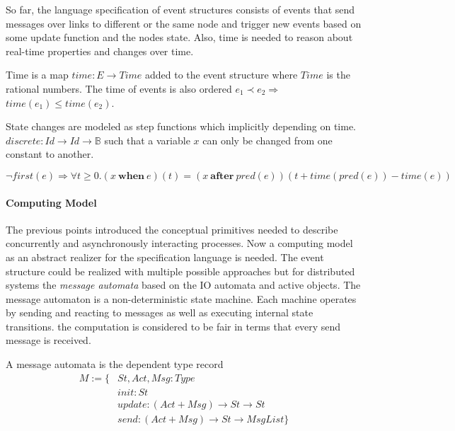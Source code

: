 So far, the language specification of event structures consists of events
that send messages over links to different or the same node and trigger new
events based on some update function and the nodes state. Also, time
is needed to reason about real-time properties and changes over time.~\cite{bickford2005causal}

\begin{defi}
  Time is a map $time:E\rightarrow Time$ added to the event structure where $Time$
  is the rational numbers. The time of events is also ordered $e_1\prec e_2\Rightarrow$
  $time(e_1)\le time(e_2)$.
\end{defi}

\begin{defi}
  State changes are modeled as step functions which implicitly depending on time.
  $discrete:Id\rightarrow Id\rightarrow \mathbb{B}$ such that a variable $x$ can only be changed
  from one constant to another.
\end{defi}

\begin{axiom}
  $\neg first(e)\Rightarrow \forall t\ge 0.(x\ \textbf{when}\ e)(t)=
  (x\ \textbf{after}\ pred(e))(t+time(pred(e))-time(e))$
\end{axiom}

\paragraph{Computing Model}
The previous points introduced the conceptual primitives needed to describe
concurrently and asynchronously interacting processes.
Now a computing model as an abstract realizer for the specification language is needed.
The event structure could be realized with multiple possible approaches but
for distributed systems the \textit{message automata} based on the IO automata
and active objects. The message automaton is a non-deterministic state machine.
Each machine operates by sending and reacting to messages as well as
executing internal state transitions.
the computation is considered to be fair in terms that every send message is
received.~\cite{bickford2003logic}


\begin{defi}
  A message automata is the dependent type record
  \begin{align*}
    M:=\{ & St,Act,Msg:Type\\
        & init:St\\
        & update:(Act+Msg)\rightarrow St\rightarrow St\\
        & send:(Act+Msg)\rightarrow St\rightarrow MsgList\}
  \end{align*}  
\end{defi}

